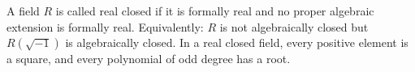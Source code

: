 A field $R$ is called real closed if it is formally real and no proper algebraic extension is formally real. Equivalently: $R$ is not algebraically closed but $R(\sqrt{-1})$ is algebraically closed. In a real closed field, every positive element is a square, and every polynomial of odd degree has a root.
